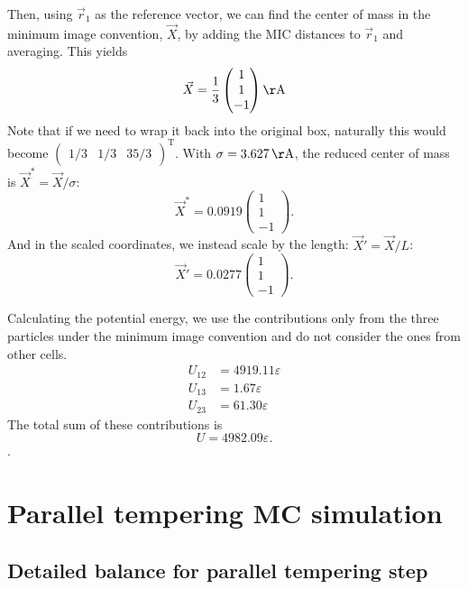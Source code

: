 \documentclass[11pt]{article}
\newcommand{\super}[1]{^{\text{#1}}}
\begin{document}
Then, using $\vec r_1$ as the reference vector, we can find the center of mass in the minimum image convention, $\vec X$, by adding the MIC distances to $\vec r_1$ and averaging.	 This yields
\begin{equation}
	\vec X = \frac13 \begin{pmatrix} 1\\1\\-1\end{pmatrix}\si{\AA}
\end{equation}
Note that if we need to wrap it back into the original box, naturally this would become $\begin{pmatrix}1/3&1/3&35/3\end{pmatrix}\super{T}$.
With $\sigma = \SI{3.627}{\AA}$, the reduced center of mass is $\vec X^* = \vec X / \sigma$:
\begin{equation}
	\vec X^* = 0.0919\begin{pmatrix} 1 \\ 1 \\ -1\end{pmatrix}.
\end{equation}
And in the scaled coordinates, we instead scale by the length: $\vec X' = \vec X/L$:
\begin{equation}
	\vec X' = 0.0277 \begin{pmatrix} 1 \\ 1 \\ -1\end{pmatrix}.
\end{equation}

Calculating the potential energy, we use the contributions only from the three particles under the minimum image convention and do not consider the ones from other cells.
\begin{align}
	U_{12} &= 4919.11\varepsilon\\
	U_{13} &= 1.67\varepsilon\\
	U_{23} &= 61.30\varepsilon
\end{align}
The total sum of these contributions is
\begin{equation*}U = 4982.09\varepsilon.\end{equation*}.

\section{Parallel tempering MC simulation}

\subsection{Detailed balance for parallel tempering step}
\end{document}
